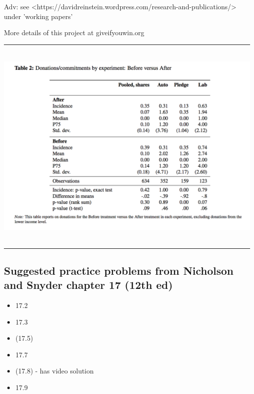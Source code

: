 \documentclass[]{article}
\providecommand{\tightlist}{%
  \setlength{\itemsep}{0pt}\setlength{\parskip}{0pt}}
\begin{document}
\textcolor{RawSienna}{Adv: see <https://davidreinstein.wordpress.com/research-and-publications/> under 'working papers'}

\bigskip

More details of this project at giveifyouwin.org

\begin{center}\rule{0.5\linewidth}{\linethickness}\end{center}

\includegraphics[height=4in]{picsfigs/beforeafer_allexp.png}

\begin{center}\rule{0.5\linewidth}{\linethickness}\end{center}

\hypertarget{suggested-practice-problems-from-nicholson-and-snyder-chapter-17-12th-ed}{%
\subsection{Suggested practice problems from Nicholson and Snyder chapter 17 (12th ed)}\label{suggested-practice-problems-from-nicholson-and-snyder-chapter-17-12th-ed}}

\begin{itemize}
\tightlist
\item
  17.2
\item
  17.3
\item
  (17.5)
\item
  17.7
\item
  (17.8) - has video solution
\item
  17.9
\end{itemize}
\end{document}
